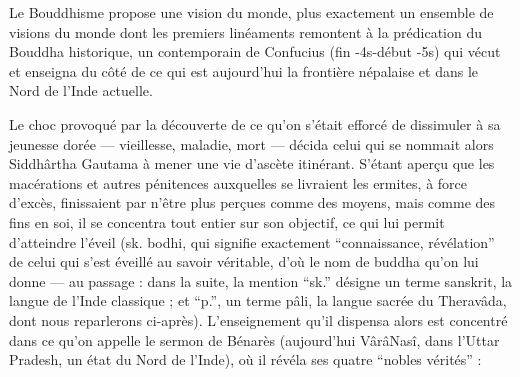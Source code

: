 Le Bouddhisme propose une vision du monde, plus exactement un ensemble de visions
du monde dont les premiers linéaments remontent à la prédication du Bouddha historique, un contemporain de Confucius (fin -4s-début -5s) qui vécut et
enseigna du côté de ce qui est aujourd'hui la frontière népalaise et dans le Nord de
l'Inde actuelle.

Le choc provoqué par la découverte de ce qu'on s'était efforcé de dissimuler à sa jeunesse dorée --- vieillesse, maladie, mort --- décida celui qui se nommait alors Siddhârtha
Gautama à mener une vie d'ascète itinérant.
S'étant aperçu que les macérations et autres pénitences auxquelles se livraient les ermites, à force d'excès, finissaient par n'être
plus perçues comme des moyens, mais comme des fins en soi, il se concentra tout entier
sur son objectif, ce qui lui permit d'atteindre l'éveil (sk. bodhi, qui signifie exactement
``connaissance, révélation'' de celui qui s'est éveillé au savoir véritable, d'où le nom de
buddha qu'on lui donne --- au passage : dans la suite, la mention ``sk.'' désigne un terme
sanskrit, la langue de l'Inde classique ; et ``p.'', un terme pâli, la langue sacrée du Theravâda, dont nous reparlerons ci-après).
L'enseignement qu'il dispensa alors est
concentré dans ce qu'on appelle le sermon de Bénarès (aujourd'hui VârâNasî, dans
l'Uttar Pradesh, un état du Nord de l'Inde), où il révéla ses quatre ``nobles vérités'' :
